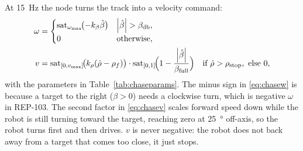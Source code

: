 At \SI{15}{Hz} the node turns the track into a velocity command:
\begin{align}
\omega &= \begin{cases}
  \operatorname{sat}_{\omega_{\max}}\!\bigl(-k_\beta\hat\beta\bigr) & \left\lvert \hat\beta \right\rvert>\beta_{\mathrm{db}},\\
  0 & \text{otherwise},\end{cases}\label{eq:chasew}\\
v &= \operatorname{sat}_{[0,v_{\max}]}\!\bigl(k_\rho(\hat\rho-\rho_f)\bigr)\cdot
     \operatorname{sat}_{[0,1]}\!\Bigl(1-\frac{\left\lvert \hat\beta \right\rvert}{\beta_{\mathrm{full}}}\Bigr)
     \quad\text{if }\hat\rho>\rho_{\mathrm{stop}},\ \text{else }0,\label{eq:chasev}
\end{align}
with the parameters in Table~\ref{tab:chaseparams}. The minus sign in
\eqref{eq:chasew} is because a target to the right ($\beta>0$) needs a
clockwise turn, which is negative $\omega$ in REP-103. The second factor in
\eqref{eq:chasev} scales forward speed down while the robot is still turning
toward the target, reaching zero at \SI{25}{\degree} off-axis, so the robot
turns first and then drives. $v$ is never negative: the robot does not back
away from a target that comes too close, it just stops.

